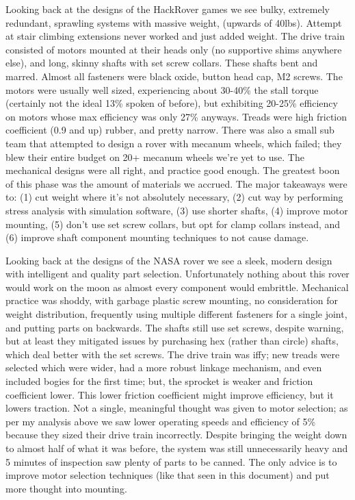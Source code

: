 \documentclass[a4paper, 10pt]{article}
\begin{document}
		Looking back at the designs of the HackRover games we see bulky, extremely redundant, sprawling systems with massive weight, (upwards of 40lbs). Attempt at stair climbing extensions never worked and just added weight. The drive train consisted of motors mounted at their heads only (no supportive shims anywhere else), and long, skinny shafts with set screw collars. These shafts bent and marred. Almost all fasteners were black oxide, button head cap, M2 screws. The motors were usually well sized, experiencing about 30-40\% the stall torque (certainly not the ideal 13\% spoken of before), but exhibiting 20-25\% efficiency on motors whose max efficiency was only 27\% anyways. Treads were high friction coefficient (0.9 and up) rubber, and pretty narrow. There was also a small sub team that attempted to design a rover with mecanum wheels, which failed; they blew their entire budget on 20+ mecanum wheels we're yet to use. The mechanical designs were all right, and practice good enough. The greatest boon of this phase was the amount of materials we accrued. The major takeaways were to: (1) cut weight where it's not absolutely necessary, (2) cut way by performing stress analysis with simulation software, (3) use shorter shafts, (4) improve motor mounting, (5) don't use set screw collars, but opt for clamp collars instead, and (6) improve shaft component mounting techniques to not cause damage.
		
		Looking back at the designs of the NASA rover we see a sleek, modern design with intelligent and quality part selection. Unfortunately nothing about this rover would work on the moon as almost every component would embrittle. Mechanical practice was shoddy, with garbage plastic screw mounting, no consideration for weight distribution, frequently using multiple different fasteners for a single joint, and putting parts on backwards. The shafts still use set screws, despite warning, but at least they mitigated issues by purchasing hex (rather than circle) shafts, which deal better with the set screws. The drive train was iffy; new treads were selected which were wider, had a more robust linkage mechanism, and even included bogies for the first time; but, the sprocket is weaker and friction coefficient lower. This lower friction coefficient might improve efficiency, but it lowers traction. Not a single, meaningful thought was given to motor selection; as per my analysis above we saw lower operating speeds and efficiency of 5\% because they sized their drive train incorrectly. Despite bringing the weight down to almost half of what it was before, the system was still unnecessarily heavy and 5 minutes of inspection saw plenty of parts to be canned. The only advice is to improve motor selection techniques (like that seen in this document) and put more thought into mounting.
		
\end{document}
